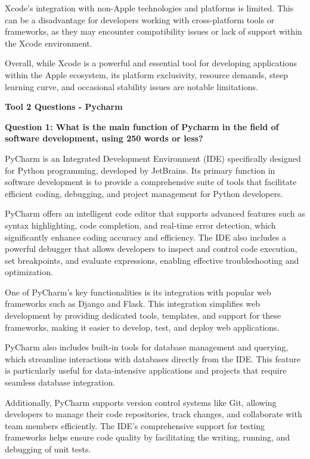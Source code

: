 \documentclass[a4paper, 11pt]{report}
\begin{document}
Xcode's integration with non-Apple technologies and platforms is limited. This can be a disadvantage for developers working with cross-platform tools or frameworks, as they may encounter compatibility issues or lack of support within the Xcode environment.

Overall, while Xcode is a powerful and essential tool for developing applications within the Apple ecosystem, its platform exclusivity, resource demands, steep learning curve, and occasional stability issues are notable limitations.

\vspace{\baselineskip}
\textbf{\large{Tool 2 Questions - Pycharm}}

\textbf{Question 1: What is the main function of Pycharm in the field of software development, using 250 words or less?}

PyCharm is an Integrated Development Environment (IDE) specifically designed for Python programming, developed by JetBrains. Its primary function in software development is to provide a comprehensive suite of tools that facilitate efficient coding, debugging, and project management for Python developers.

PyCharm offers an intelligent code editor that supports advanced features such as syntax highlighting, code completion, and real-time error detection, which significantly enhance coding accuracy and efficiency. The IDE also includes a powerful debugger that allows developers to inspect and control code execution, set breakpoints, and evaluate expressions, enabling effective troubleshooting and optimization.

One of PyCharm's key functionalities is its integration with popular web frameworks such as Django and Flask. This integration simplifies web development by providing dedicated tools, templates, and support for these frameworks, making it easier to develop, test, and deploy web applications.

PyCharm also includes built-in tools for database management and querying, which streamline interactions with databases directly from the IDE. This feature is particularly useful for data-intensive applications and projects that require seamless database integration.

Additionally, PyCharm supports version control systems like Git, allowing developers to manage their code repositories, track changes, and collaborate with team members efficiently. The IDE’s comprehensive support for testing frameworks helps ensure code quality by facilitating the writing, running, and debugging of unit tests.
\end{document}
